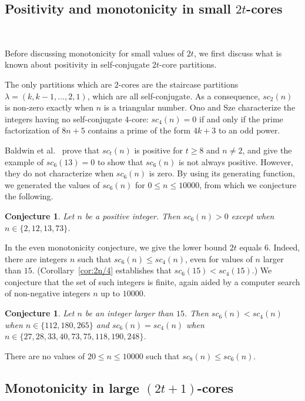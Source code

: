 \documentclass[12pt,leqno]{amsart}
\newtheorem{conj}[lem]{Conjecture}
\numberwithin{equation}{section}
\theoremstyle{definition}
\begin{document}
\subsection{Positivity and monotonicity in small $2t$-cores}\

Before discussing monotonicity for small values of $2t$, we first discuss what is known about positivity in self-conjugate $2t$-core partitions.

The only partitions which are $2$-cores are the staircase partitions ${\lambda}=(k,k-1,\hdots,2,1)$, which are all self-conjugate.  As a consequence, $sc_2(n)$ is non-zero exactly when $n$ is a triangular number.  Ono and Sze \cite[Theorem 3]{OnoSze} characterize the integers having no self-conjugate $4$-core: $sc_4(n)=0$ if and only if the prime factorization of $8n+5$ contains a prime of the form $4k+3$ to an odd power.

Baldwin et al.\ \cite{Baldwin} prove that $sc_t(n)$ is positive for $t\geq 8$ and $n\ne 2$, and give the example of $sc_6(13)=0$ to show that $sc_6(n)$ is not always positive. However, they do not characterize when $sc_6(n)$ is zero.  By using its generating function, we generated the values of $sc_6(n)$ for $0\leq n\leq 10000$, from which we conjecture the following.

\begin{conj} Let $n$ be a positive integer.  Then $sc_6(n)> 0$ except when $n\in\{2,12,13,73\}$.
\label{conj:6core}
\end{conj}

In the even monotonicity conjecture, we give the lower bound $2t$ equals $6$.  Indeed, there are integers $n$ such that  $sc_6(n)\leq sc_4(n)$, even for values of $n$ larger than $15$. (Corollary~\ref{cor:2n/4}  establishes that $sc_6(15)<sc_4(15)$.)  We conjecture that the set of such integers is finite, again aided by a computer search of non-negative integers $n$ up to $10000$.

\begin{conj} Let $n$ be an integer larger than $15$. Then $sc_6(n)<sc_4(n)$ when $n\in\{112,180,265\}$ and $sc_6(n)=sc_4(n)$ when $n\in\{27, 28, 33, 40, 73, 75, 118, 190, 248\}$.
\end{conj}

There are no values of $20 \leq n \leq 10000$ such that $sc_8(n)\leq sc_6(n)$.

\subsection{Monotonicity in large $(2t+1)$-cores}\
\end{document}
